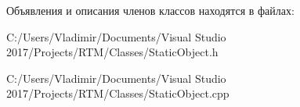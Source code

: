 Объявления и описания членов классов находятся в файлах\+:\begin{DoxyCompactItemize}
\item 
C\+:/\+Users/\+Vladimir/\+Documents/\+Visual Studio 2017/\+Projects/\+R\+T\+M/\+Classes/Static\+Object.\+h\item 
C\+:/\+Users/\+Vladimir/\+Documents/\+Visual Studio 2017/\+Projects/\+R\+T\+M/\+Classes/Static\+Object.\+cpp\end{DoxyCompactItemize}
